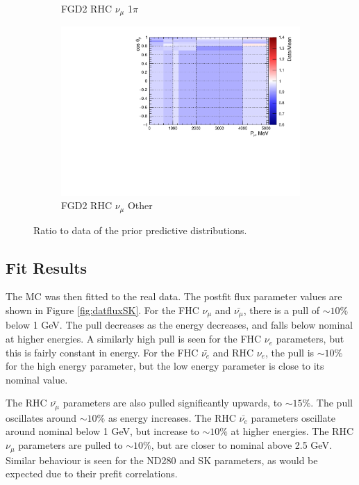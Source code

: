 \begin{figure}
\begin{subfigure}{.32\textwidth}
  \caption{FGD2 RHC $\nu_{\mu}$ 1$\pi$}
  \label{fig:priorpred_FGD2_NuMuBkg_CC1pi_in_AntiNu_Mode}
\end{subfigure}
\begin{subfigure}{.32\textwidth}
  \centering
  \includegraphics[width=0.85\linewidth]{figs/priorpred_FGD2_NuMuBkg_CCOther_in_AntiNu_Mode.pdf}
  \caption{FGD2 RHC $\nu_{\mu}$ Other}
  \label{fig:priorpred_FGD2_NuMuBkg_CCOther_in_AntiNu_Mode}
\end{subfigure}
\caption{Ratio to data of the prior predictive distributions.}
\label{fig:priorpreds}
\end{figure}

\subsection{Fit Results}

The MC was then fitted to the real data. The postfit flux parameter values are shown in Figure \ref{fig:datfluxSK}. For the FHC $\nu_{\mu}$ and $\bar{\nu_{\mu}}$, there is a pull of $\sim10\%$ below 1 GeV. The pull decreases as the energy decreases, and falls below nominal at higher energies. A similarly high pull is seen for the FHC $\nu_e$ parameters, but this is fairly constant in energy. For the FHC $\bar{\nu_e}$ and RHC $\nu_e$, the pull is $\sim10\%$ for the high energy parameter, but the low energy parameter is close to its nominal value.

The RHC $\bar{\nu_{\mu}}$ parameters are also pulled significantly upwards, to $\sim15\%$. The pull oscillates around $\sim10\%$ as energy increases. The RHC $\bar{\nu_e}$ parameters oscillate around nominal below 1 GeV, but increase to $\sim10\%$ at higher energies. The RHC $\nu_{\mu}$ parameters are pulled to $\sim10\%$, but are closer to nominal above 2.5 GeV. Similar behaviour is seen for the ND280 and SK parameters, as would be expected due to their prefit correlations.

